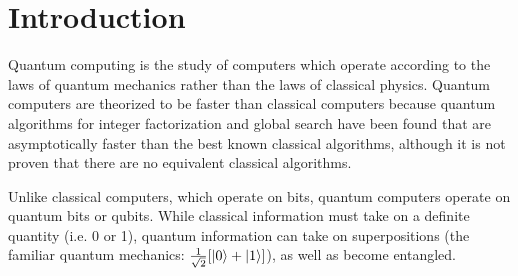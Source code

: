 \chapter{Introduction}
Quantum computing is the study of computers which operate according to the laws of quantum mechanics rather than the laws of classical physics.  Quantum computers are theorized to be faster than classical computers because quantum algorithms for integer factorization\cite{shor} and global search\cite{grover} have been found that are asymptotically faster than the best known classical algorithms, although it is not proven that there are no equivalent classical algorithms.

Unlike classical computers, which operate on bits, quantum computers operate on quantum bits or qubits.  While classical information must take on a definite quantity (i.e. 0 or 1), quantum information can take on superpositions (the familiar quantum mechanics: $\frac{1}{\sqrt{2}}[\mathinner{|{0}\rangle} + \mathinner{|{1}\rangle}]$), as well as become entangled.
